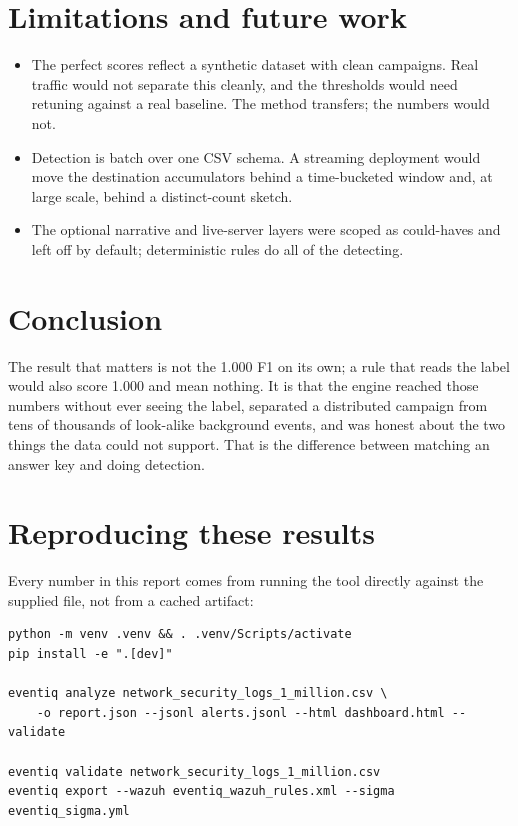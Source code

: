 \documentclass[11pt,a4paper]{article}
\begin{document}
\section{Limitations and future work}

\begin{itemize}
\item The perfect scores reflect a synthetic dataset with clean campaigns.
Real traffic would not separate this cleanly, and the thresholds would need
retuning against a real baseline. The method transfers; the numbers would not.
\item Detection is batch over one CSV schema. A streaming deployment would move
the destination accumulators behind a time-bucketed window and, at large scale,
behind a distinct-count sketch.
\item The optional narrative and live-server layers were scoped as could-haves
and left off by default; deterministic rules do all of the detecting.
\end{itemize}

\section{Conclusion}

The result that matters is not the 1.000 F1 on its own; a rule that reads the
label would also score 1.000 and mean nothing. It is that the engine reached
those numbers without ever seeing the label, separated a distributed campaign
from tens of thousands of look-alike background events, and was honest about the
two things the data could not support. That is the difference between matching an
answer key and doing detection.

\section*{Reproducing these results}

Every number in this report comes from running the tool directly against the
supplied file, not from a cached artifact:

\begin{lstlisting}
python -m venv .venv && . .venv/Scripts/activate
pip install -e ".[dev]"

eventiq analyze network_security_logs_1_million.csv \
    -o report.json --jsonl alerts.jsonl --html dashboard.html --validate

eventiq validate network_security_logs_1_million.csv
eventiq export --wazuh eventiq_wazuh_rules.xml --sigma eventiq_sigma.yml
\end{lstlisting}
\end{document}
